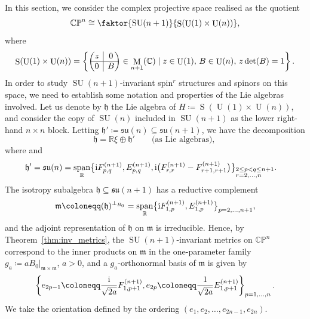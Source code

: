 \documentclass[pdftex]{sigma}
\numberwithin{equation}{section}
\newcommand{\restr}[1]{|_{#1}}
\newcommand{\rvline}{\hspace*{-\arraycolsep}\vline\hspace*{-\arraycolsep}}
\DeclareMathOperator{\vecspan}{span}
\DeclareMathOperator{\SU}{SU}
\DeclareMathOperator{\U}{U}
\DeclareMathOperator{\Special}{S}
\DeclareMathOperator{\Mat}{M}
\begin{document}
		In this section, we consider the complex projective space realised as the quotient
		\[
		\mathbb{CP}^n \cong \faktor{\SU(n+1)}{\Special ( \U(1) \times \U(n) )} ,
		\]
		where
		\begin{equation*}
			\Special (\U(1) \times \U(n) ) = \left\{
			\begin{pmatrix}
				z
				& \rvline & 0 \\
				\hline
				0 & \rvline &
				B
			\end{pmatrix}
			\in \Mat_{n+1} ( \mathbb{C} ) \mid z \in \U(1) , \, B \in \U(n), \, z \det(B) = 1
			\right\} .
		\end{equation*}
		In order to study $\SU(n+1)$-invariant spin$^r$ structures and spinors on this space, we need to establish some notation and properties of the Lie algebras involved. Let us denote by $\mathfrak{h}$ the Lie algebra of $H \coloneqq \Special (\U(1) \times \U(n) )$, and consider the copy of $\SU(n)$ included in $\SU(n+1)$ as the lower right-hand $n \times n$ block. Letting $\mathfrak{h}' \coloneqq \mathfrak{su}(n) \subseteq \mathfrak{su}(n+1)$, we have the decomposition
		\begin{equation*}
			\mathfrak{h} = \mathbb{R}\xi \oplus \mathfrak{h}' \qquad \text{(as Lie algebras), }
		\end{equation*}
		where  and
		\begin{align*}
			&\mathfrak{h}' = \mathfrak{su}(n) = \vecspan_{\mathbb{R}} \bigl\{ {\rm i} F_{p,q}^{(n+1)}, E_{p,q}^{(n+1)}, {\rm i}\bigl( F_{r,r}^{(n+1)} - F_{r+1,r+1}^{(n+1)} \bigr)\bigr\}_{\begin{subarray}{l} 2 \leq p < q \leq n+1 \\ r = 2 , \dots, n \end{subarray}} .
		\end{align*}
		The isotropy subalgebra $\mathfrak{h} \subseteq \mathfrak{su}(n+1)$ has a reductive complement
		\begin{equation*}
			\mathfrak{m} \coloneqq ( \mathfrak{h})^{\perp_{B_0}} = \vecspan_{\mathbb{R}} \bigl\{ {\rm i} F_{1,p}^{(n+1)}, E_{1,p}^{(n+1)}\bigr\}_{p = 2, \dots, n+1} ,
		\end{equation*}
		and the adjoint representation of $\mathfrak{h}$ on $\mathfrak{m}$ is irreducible. Hence, by Theorem~\ref{thm:inv_metrics}, the $\SU(n+1)$-invariant metrics on $\mathbb{CP}^n$ correspond to the inner products on $\mathfrak{m}$ in the one-parameter family~${
			g_a \coloneqq a B_0 \restr{\mathfrak{m} \times \mathfrak{m}}}$, $ a >0 $,
		and a $g_a$-orthonormal basis of $\mathfrak{m}$ is given by
		\begin{equation*}
			\left\{ e_{2p-1} \coloneqq \frac{{\rm i}}{\sqrt{2a}} F_{1,p+1}^{(n+1)} , e_{2p} \coloneqq \frac{1}{\sqrt{2a}} E_{1,p+1}^{(n+1)} \right\}_{p=1, \dots, n} .
		\end{equation*}
		We take the orientation defined by the ordering $(e_1,e_2,\dots,e_{2n-1},e_{2n})$.
		
\end{document}
